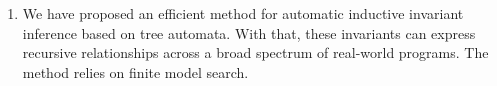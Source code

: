 
\begin{enumerate}
\item We have proposed an efficient method for automatic inductive invariant inference based on tree automata. With that, these invariants can express recursive relationships across a broad spectrum of real-world programs. The method relies on finite model search.


\end{enumerate}
